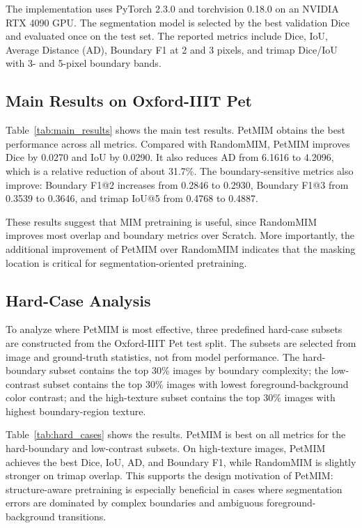 \documentclass[11pt]{article}
\begin{document}
The implementation uses PyTorch 2.3.0 and torchvision 0.18.0 on an NVIDIA RTX 4090 GPU. The segmentation model is selected by the best validation Dice and evaluated once on the test set. The reported metrics include Dice, IoU, Average Distance (AD), Boundary F1 at 2 and 3 pixels, and trimap Dice/IoU with 3- and 5-pixel boundary bands.


\subsection{Main Results on Oxford-IIIT Pet}

Table~\ref{tab:main_results} shows the main test results. PetMIM obtains the best performance across all metrics. Compared with RandomMIM, PetMIM improves Dice by 0.0270 and IoU by 0.0290. It also reduces AD from 6.1616 to 4.2096, which is a relative reduction of about 31.7\%. The boundary-sensitive metrics also improve: Boundary F1@2 increases from 0.2846 to 0.2930, Boundary F1@3 from 0.3539 to 0.3646, and trimap IoU@5 from 0.4768 to 0.4887.

These results suggest that MIM pretraining is useful, since RandomMIM improves most overlap and boundary metrics over Scratch. More importantly, the additional improvement of PetMIM over RandomMIM indicates that the masking location is critical for segmentation-oriented pretraining.

\subsection{Hard-Case Analysis}

To analyze where PetMIM is most effective, three predefined hard-case subsets are constructed from the Oxford-IIIT Pet test split. The subsets are selected from image and ground-truth statistics, not from model performance. The hard-boundary subset contains the top 30\% images by boundary complexity; the low-contrast subset contains the top 30\% images with lowest foreground-background color contrast; and the high-texture subset contains the top 30\% images with highest boundary-region texture.

Table~\ref{tab:hard_cases} shows the results. PetMIM is best on all metrics for the hard-boundary and low-contrast subsets. On high-texture images, PetMIM achieves the best Dice, IoU, AD, and Boundary F1, while RandomMIM is slightly stronger on trimap overlap. This supports the design motivation of PetMIM: structure-aware pretraining is especially beneficial in cases where segmentation errors are dominated by complex boundaries and ambiguous foreground-background transitions.
\end{document}
